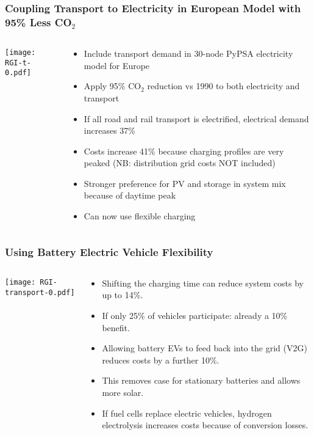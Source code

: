 \documentclass[10pt,aspectratio=169,dvipsnames]{beamer}
\let\olditem\item
\renewcommand{\item}{%
\olditem\vspace{5pt}}
\begin{document}
\begin{frame}
  \frametitle{Coupling Transport to Electricity in European Model with 95\% Less CO$_2$}
  \begin{columns}[T]
    \begin{column}{7cm}
      \texttt{[image: RGI-t-0.pdf]}


    \end{column}
    \begin{column}{7cm}
      \begin{itemize}
      \item Include transport demand in 30-node PyPSA electricity model for Europe
      \item Apply 95\% CO$_2$ reduction vs 1990 to both electricity and transport
      \item If all road and rail transport is electrified, electrical demand increases 37\%
      \item Costs increase 41\% because charging profiles are very peaked (NB: distribution grid costs NOT included)
      \item Stronger preference for PV and storage in system mix because of daytime peak
      \item Can now use flexible charging
      \end{itemize}
    \end{column}
  \end{columns}
\end{frame}




\begin{frame}
  \frametitle{Using Battery Electric Vehicle Flexibility}
  \begin{columns}[T]
    \begin{column}{9cm}
      \texttt{[image: RGI-transport-0.pdf]}


    \end{column}
    \begin{column}{6cm}
      \begin{itemize}
      \item Shifting the charging time can reduce system costs by up to 14\%.
      \item If only 25\% of vehicles participate: already a 10\% benefit.
      \item Allowing battery EVs to feed back into the grid (V2G) reduces costs by a further 10\%.
      \item This removes case for stationary batteries and allows more solar.
      \item If fuel cells replace electric vehicles, hydrogen electrolysis increases costs because of conversion losses.
      \end{itemize}
    \end{column}
  \end{columns}
\end{frame}
\end{document}
